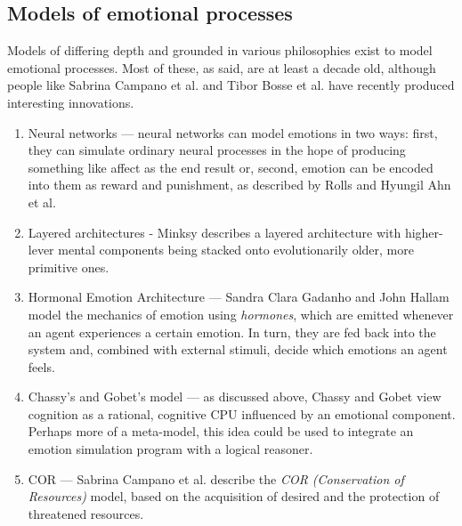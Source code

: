 \documentclass[]{scrartcl}
\begin{document}

\subsection{Models of emotional processes}

Models of differing depth and grounded in various philosophies exist to model emotional processes. Most of these, as said, are at least a decade old, although people like Sabrina Campano et al. \cite{DBLP:conf/acii/CampanoSCS11} and Tibor Bosse et al. \cite{DBLP:conf/prima/BosseDMTW09} have recently produced interesting innovations.

\begin{enumerate}
	\item Neural networks --- neural networks can model emotions in two ways: first, they can simulate ordinary neural processes in the hope of producing something like affect as the end result or, second, emotion can be encoded into them as reward and punishment, as described by Rolls\cite{rolls2003} and Hyungil Ahn et al. \cite{ahnpicard2006}
	\item Layered architectures - Minksy \cite{minsky} describes a layered architecture with higher-lever mental components being stacked onto evolutionarily older, more primitive ones.
	
	\item Hormonal Emotion Architecture --- Sandra Clara Gadanho and John Hallam \cite{DBLP:journals/adb/GadanhoH01} model the mechanics of emotion using {\em hormones}, which are emitted whenever an agent experiences a certain emotion. In turn, they are fed back into the system and, combined with external stimuli, decide which emotions an agent feels.
	
	\item Chassy's and Gobet's model --- as discussed above, Chassy and Gobet view cognition as a rational, cognitive CPU influenced by an emotional component. Perhaps more of a meta-model, this idea could be used to integrate an emotion simulation program with a logical reasoner.
	
	\item COR --- Sabrina Campano et al. \cite{DBLP:conf/acii/CampanoSCS11} describe the {\em COR (Conservation of Resources)} model, based on the acquisition of desired and the protection of threatened resources.
	

\end{enumerate}
\end{document}
